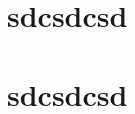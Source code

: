 \documentclass{memoir}
\begin{document}
\chapter{sdcsdcsd}

\lipsum[1-4]

\chapter{sdcsdcsd}

\lipsum[1-4]
\end{document}
